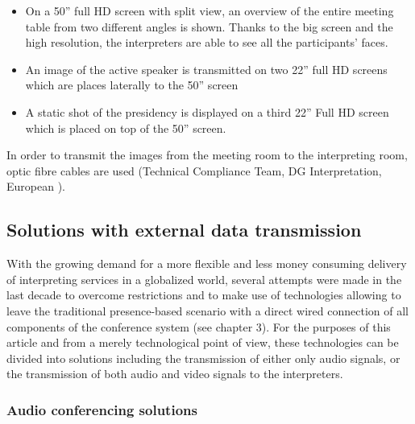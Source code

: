 \documentclass[output=paper]{langsci/langscibook}
\begin{document}
\begin{itemize}
\item On a 50” full HD screen with split view, an overview of the entire meeting table from two different angles is shown. Thanks to the big screen and the high resolution, the interpreters are able to see all the participants’ faces.
\item An image of the active speaker is transmitted on two 22” full HD screens which are places laterally to the 50” screen
\item A static shot of the presidency is displayed on a third 22” Full HD screen which is placed on top of the 50” screen.
\end{itemize}

In order to transmit the images from the meeting room to the interpreting room, optic fibre cables are used (Technical Compliance Team, DG Interpretation, European \citealt{Commission2016}). 

\subsection{Solutions with external data transmission} 

With the growing demand for a more flexible and less money consuming delivery of interpreting services in a globalized world, several attempts were made in the last decade to overcome restrictions and to make use of technologies allowing to leave the traditional presence-based scenario with a direct wired connection of all components of the conference system (see chapter 3). For the purposes of this article and from a merely technological point of view, these technologies can be divided into solutions including the transmission of either only audio signals, or the transmission of both audio and video signals to the interpreters. 

\subsubsection{Audio conferencing solutions}
\end{document}

